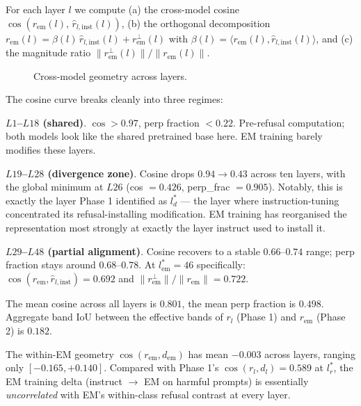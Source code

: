For each layer $l$ we compute (a) the cross-model cosine
$\cos(r_{\text{em}}(l),\, \hat{r}_{l,\text{inst}}(l))$, (b) the
orthogonal decomposition
$r_{\text{em}}(l) = \beta(l)\,\hat{r}_{l,\text{inst}}(l)
                  + r_{\text{em}}^{\perp}(l)$
with $\beta(l) = \langle r_{\text{em}}(l),
\hat{r}_{l,\text{inst}}(l) \rangle$, and (c) the magnitude ratio
$\|r_{\text{em}}^\perp(l)\| / \|r_{\text{em}}(l)\|$.

\begin{figure}[t]
\centering
{}
\caption{Cross-model geometry across layers.}
\label{fig:p2-geom}
\end{figure}

The cosine curve breaks cleanly into three regimes:

\textbf{$L1$--$L18$ (shared)}. $\cos > 0.97$, perp fraction $< 0.22$.
Pre-refusal computation; both models look like the shared pretrained
base here. EM training barely modifies these layers.

\textbf{$L19$--$L28$ (divergence zone)}. Cosine drops $0.94 \to 0.43$
across ten layers, with the global minimum at $L26$
(cos $= 0.426$, perp\_frac $= 0.905$). Notably, this is exactly the
layer Phase 1 identified as $l^*_d$ --- the layer where
instruction-tuning concentrated its refusal-installing modification.
EM training has reorganised the representation most strongly at
exactly the layer instruct used to install it.

\textbf{$L29$--$L48$ (partial alignment)}. Cosine recovers to a
stable $0.66$--$0.74$ range; perp fraction stays around $0.68$--$0.78$.
At $l^*_{\text{em}} = 46$ specifically:
$\cos(r_{\text{em}}, \hat{r}_{l,\text{inst}}) = 0.692$ and
$\|r_{\text{em}}^\perp\|/\|r_{\text{em}}\| = 0.722$.

The mean cosine across all layers is $0.801$, the mean perp fraction
is $0.498$. Aggregate band IoU between the effective bands of $r_l$
(Phase 1) and $r_{\text{em}}$ (Phase 2) is $0.182$.

The within-EM geometry $\cos(r_{\text{em}}, d_{\text{em}})$ has mean
$-0.003$ across layers, ranging only $[-0.165, +0.140]$. Compared
with Phase 1's $\cos(r_l, d_l) = 0.589$ at $l^*_r$, the EM training
delta (instruct $\to$ EM on harmful prompts) is essentially
\emph{uncorrelated} with EM's within-class refusal contrast at every
layer.

